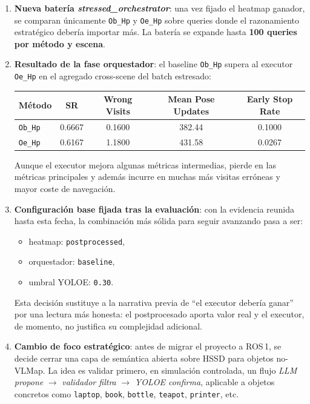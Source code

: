\begin{enumerate}
  \item \textbf{Nueva batería \emph{stressed\_orchestrator}}: una vez fijado el
        heatmap ganador, se comparan únicamente \texttt{Ob\_Hp} y
        \texttt{Oe\_Hp} sobre queries donde el razonamiento estratégico debería
        importar más. La batería se expande hasta \textbf{100 queries por
        método y escena}.

  \item \textbf{Resultado de la fase orquestador}: el baseline
        \texttt{Ob\_Hp} supera al executor \texttt{Oe\_Hp} en el agregado
        cross-scene del batch estresado:
        \begin{center}
        \begin{tabular}{lcccc}
        \toprule
        \textbf{Método} & \textbf{SR} & \textbf{Wrong Visits} &
        \textbf{Mean Pose Updates} & \textbf{Early Stop Rate} \\
        \midrule
        \texttt{Ob\_Hp} & 0.6667 & 0.1600 & 382.44 & 0.1000 \\
        \texttt{Oe\_Hp} & 0.6167 & 1.1800 & 431.58 & 0.0267 \\
        \bottomrule
        \end{tabular}
        \end{center}
        Aunque el executor mejora algunas métricas intermedias, pierde en las
        métricas principales y además incurre en muchas más visitas erróneas y
        mayor coste de navegación.

  \item \textbf{Configuración base fijada tras la evaluación}: con la evidencia
        reunida hasta esta fecha, la combinación más sólida para seguir
        avanzando pasa a ser:
        \begin{itemize}
          \item heatmap: \texttt{postprocessed},
          \item orquestador: \texttt{baseline},
          \item umbral YOLOE: \texttt{0.30}.
        \end{itemize}
        Esta decisión sustituye a la narrativa previa de ``el executor debería
        ganar'' por una lectura más honesta: el postprocesado aporta valor real
        y el executor, de momento, no justifica su complejidad adicional.

  \item \textbf{Cambio de foco estratégico}: antes de migrar el proyecto a
        ROS\,1, se decide cerrar una capa de semántica abierta sobre HSSD para
        objetos no-VLMap. La idea es validar primero, en simulación controlada,
        un flujo \emph{LLM propone} $\rightarrow$
        \emph{validador filtra} $\rightarrow$
        \emph{YOLOE confirma}, aplicable a objetos concretos como
        \texttt{laptop}, \texttt{book}, \texttt{bottle}, \texttt{teapot},
        \texttt{printer}, etc.


\end{enumerate}
